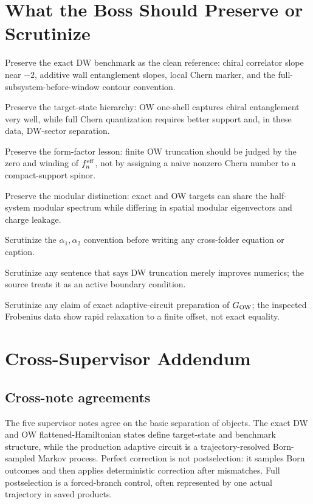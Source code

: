 \documentclass[aps,prb,onecolumn,nofootinbib,superscriptaddress]{revtex4-2}
\newcommand{\GO}{G_{\rm OW}}
\begin{document}
\section{What the Boss Should Preserve or Scrutinize}

Preserve the exact DW benchmark as the clean reference: chiral correlator slope near $-2$, additive wall entanglement slopes, local Chern marker, and the full-subsystem-before-window contour convention.

Preserve the target-state hierarchy: OW one-shell captures chiral entanglement very well, while full Chern quantization requires better support and, in these data, DW-sector separation.

Preserve the form-factor lesson: finite OW truncation should be judged by the zero and winding of $f_n^{\rm eff}$, not by assigning a naive nonzero Chern number to a compact-support spinor.

Preserve the modular distinction: exact and OW targets can share the half-system modular spectrum while differing in spatial modular eigenvectors and charge leakage.

Scrutinize the $\alpha_1,\alpha_2$ convention before writing any cross-folder equation or caption.

Scrutinize any sentence that says DW truncation merely improves numerics; the source treats it as an active boundary condition.

Scrutinize any claim of exact adaptive-circuit preparation of $\GO$; the inspected Frobenius data show rapid relaxation to a finite offset, not exact equality.

\section{Cross-Supervisor Addendum}

\subsection{Cross-note agreements}

The five supervisor notes agree on the basic separation of objects.  The exact DW and OW flattened-Hamiltonian states define target-state and benchmark structure, while the production adaptive circuit is a trajectory-resolved Born-sampled Markov process.  Perfect correction is not postselection: it samples Born outcomes and then applies deterministic correction after mismatches.  Full postselection is a forced-branch control, often represented by one actual trajectory in saved products.
\end{document}
